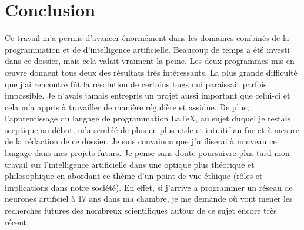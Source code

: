 \documentclass[12pt, a4paper, openany]{book}
\begin{document}
\section*{\huge{Conclusion}}
Ce travail m'a permis d'avancer énormément dans les domaines combinés de la programmation et de d'intelligence artificielle. Beaucoup de temps a été investi dans ce dossier, mais cela valait vraiment la peine. Les deux programmes mis en œuvre donnent tous deux des résultats très intéressants. La plus grande difficulté que j'ai rencontré fût la résolution de certains bugs qui paraissait parfois impossible. Je n'avais jamais entrepris un projet aussi important que celui-ci et cela m'a appris à travailler de manière régulière et assidue. De plus, l'apprentissage du langage de programmation \LaTeX, au sujet duquel je restais sceptique au début, m'a semblé de plus en plus utile et intuitif au fur et à mesure de la rédaction de ce dossier. Je suis convaincu que j'utiliserai à nouveau ce langage dans mes projets futurs. Je pense sans doute poursuivre plus tard mon travail sur l'intelligence artificielle dans une optique plus théorique et philosophique en abordant ce thème d'un point de vue éthique (rôles et implications dans notre société). En effet, si j'arrive a programmer un réseau de neurones artificiel à 17 ans dans ma chambre, je me demande où vont mener les recherches futures des nombreux scientifiques autour de ce sujet encore très récent.

\newpage
\pagestyle{plain}
\end{document}
